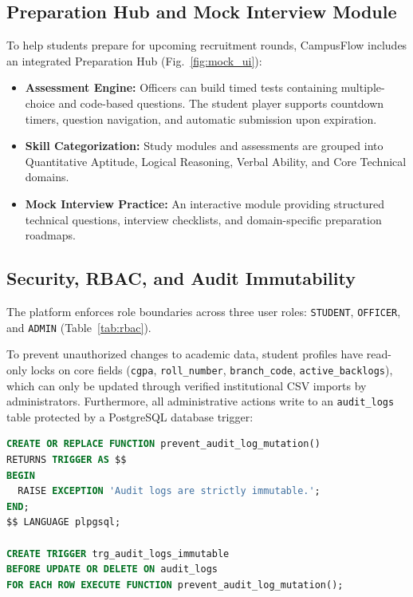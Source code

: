 \documentclass[conference]{IEEEtran}
\begin{document}
\subsection{Preparation Hub and Mock Interview Module}
To help students prepare for upcoming recruitment rounds, CampusFlow includes an integrated Preparation Hub (Fig.~\ref{fig:mock_ui}):
\begin{itemize}
    \item \textbf{Assessment Engine:} Officers can build timed tests containing multiple-choice and code-based questions. The student player supports countdown timers, question navigation, and automatic submission upon expiration.
    \item \textbf{Skill Categorization:} Study modules and assessments are grouped into Quantitative Aptitude, Logical Reasoning, Verbal Ability, and Core Technical domains.
    \item \textbf{Mock Interview Practice:} An interactive module providing structured technical questions, interview checklists, and domain-specific preparation roadmaps.
\end{itemize}

\subsection{Security, RBAC, and Audit Immutability}
The platform enforces role boundaries across three user roles: \texttt{STUDENT}, \texttt{OFFICER}, and \texttt{ADMIN} (Table~\ref{tab:rbac}). 

To prevent unauthorized changes to academic data, student profiles have read-only locks on core fields (\texttt{cgpa}, \texttt{roll\_number}, \texttt{branch\_code}, \texttt{active\_backlogs}), which can only be updated through verified institutional CSV imports by administrators. Furthermore, all administrative actions write to an \texttt{audit\_logs} table protected by a PostgreSQL database trigger:

\begin{lstlisting}[language=SQL]
CREATE OR REPLACE FUNCTION prevent_audit_log_mutation()
RETURNS TRIGGER AS $$
BEGIN
  RAISE EXCEPTION 'Audit logs are strictly immutable.';
END;
$$ LANGUAGE plpgsql;

CREATE TRIGGER trg_audit_logs_immutable
BEFORE UPDATE OR DELETE ON audit_logs
FOR EACH ROW EXECUTE FUNCTION prevent_audit_log_mutation();
\end{lstlisting}
\end{document}
